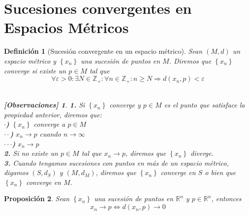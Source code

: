 \documentclass[oneside]{book} %
\theoremstyle{Teorema}
\newtheorem{Definicion}{Definición}[chapter]
\newtheorem{Proposicion}[Definicion]{Proposición}
\theoremstyle{Ejemplos}
\theoremstyle{[Obs]}
\newtheorem*{Obs}{[Observaciones]}
\renewcommand{\{}{\left\lbrace} %
\renewcommand{\}}{\right\rbrace} %
\newcommand{\Rn}{\mathbb{R}^n} %
\begin{document}
		\section{Sucesiones convergentes en Espacios Métricos}

			\begin{Definicion}[Sucesión convergente en un espacio métrico]

				Sean $(M, d)$ un espacio métrico y $\{ x_n \}$ una sucesión de puntos en $M$. Diremos que $\{ x_n \}$ converge si existe un $p \in M$ tal que \\

				\[ \forall \varepsilon > 0 : \exists N \in \mathbb{Z}_{+} : \forall n \in \mathbb{Z}_{+} : n \geq N \Rightarrow d(x_n, p) < \varepsilon \] \\

				\begin{Obs}
				
					\hfill
				
					\textbf{1.} Si $\{ x_n \}$ converge y $p \in M$ es el punto que satisface la propiedad anterior, diremos que: \\
					
					\hspace{1cm}\textbf{$\cdot$)} $\{ x_n \}$ converge a $p \in M$ \\
				
					\hspace{1cm}\textbf{$\cdot \cdot$)} $x_n \to p$ cuando $n \to \infty$ \\

					\hspace{1cm}\textbf{$\cdot \cdot \cdot$)} $x_n \to p$ \\

					\textbf{2.} Si no existe un $p \in M$ tal que $x_n \to p$, diremos que $\{ x_n \}$ diverge. \\

					\textbf{3.} Cuando tengamos sucesiones con puntos en más de un espacio métrico, digamos $(S, d_S)$ y $(M, d_M)$, diremos que $\{ x_n \}$ converge en $S$ o bien que $\{ x_n \}$ converge en $M$. \\

				\end{Obs}
				
			\end{Definicion}

			\begin{Proposicion}
				
				Sean $\{ x_n \}$ una sucesión de puntos en $\Rn$ y $p \in \Rn$, entonces \\

				\[ x_n \to p \Leftrightarrow d(x_n, p) \to 0 \] \\

			\end{Proposicion}
\end{document}
